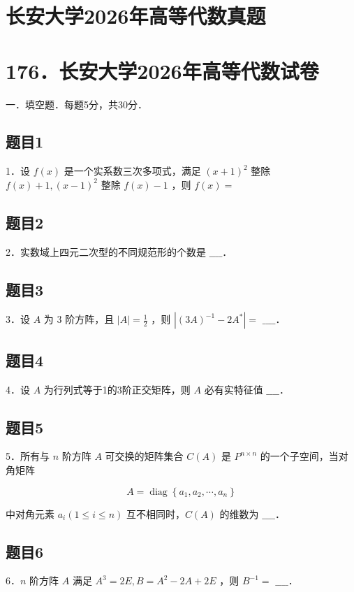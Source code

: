 \documentclass{article}
\begin{document}
\section*{长安大学2026年高等代数真题}
\section*{176．长安大学2026年高等代数试卷}
一．填空题．每题5分，共30分．\\

\subsection{题目1}
1．设 \(f(x)\) 是一个实系数三次多项式，满足 \((x+1)^{2}\) 整除 \(f(x)+1,(x-1)^{2}\) 整除 \(f(x)-1\) ，则 \(f(x)=\)

\subsection{题目2}
2．实数域上四元二次型的不同规范形的个数是 \(\_\_\_\_\)．

\subsection{题目3}
3．设 \(A\) 为 3 阶方阵，且 \(|A|=\frac{1}{2}\) ，则 \(\left|(3 A)^{-1}-2 A^{*}\right|=\) \(\_\_\_\_\)．

\subsection{题目4}
4．设 \(A\) 为行列式等于1的3阶正交矩阵，则 \(A\) 必有实特征值 \(\_\_\_\_\)．

\subsection{题目5}
5．所有与 \(n\) 阶方阵 \(A\) 可交换的矩阵集合 \(C(A)\) 是 \(P^{n \times n}\) 的一个子空间，当对角矩阵

\[
A=\operatorname{diag}\left\{a_{1}, a_{2}, \cdots, a_{n}\right\}
\]

中对角元素 \(a_{i}(1 \leq i \leq n)\) 互不相同时，\(C(A)\) 的维数为 \(\_\_\_\_\)．

\subsection{题目6}
6．\(n\) 阶方阵 \(A\) 满足 \(A^{3}=2 E, B=A^{2}-2 A+2 E\) ，则 \(B^{-1}=\) \(\_\_\_\_\)．
\end{document}
